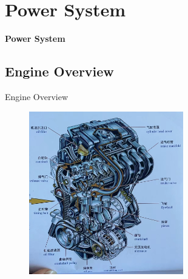 
\graphicspath{{../img/}}
\newcommand\struc[3][]{\begin{frame}
		\begin{block}{#1}
			\begin{compactitem}
				\item structure
					\begin{figure}[htbp]
						\centering
						\texttt{[image: \#3]}
					\end{figure}
\end{compactitem}
\end{block}
\end{frame}}


\abovedisplayshortskip=0pt	%
\belowdisplayshortskip=0pt
\abovedisplayskip=0pt	%
\belowdisplayskip=0pt
\section{Power System}
\begin{frame}
	\centering\Huge\textbf{Power System}
\end{frame}
\subsection{Engine Overview}
\begin{frame}{Engine Overview}	%
	\begin{block}{} %
		\begin{figure}[htbp]
			\centering
			\includegraphics[width=0.6\textwidth]{2-1}
		\end{figure}
	\end{block}
\end{frame}
